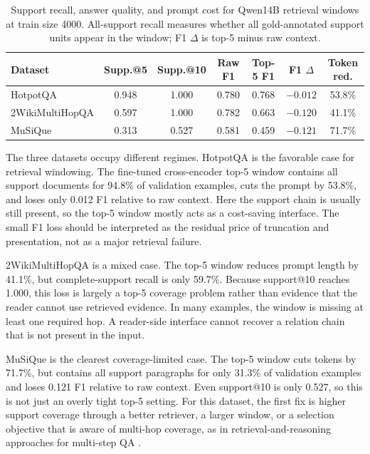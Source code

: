 \documentclass[a4paper,fleqn]{cas-sc}
\begin{document}
\begin{table}[t]
\centering
\caption{Support recall, answer quality, and prompt cost for Qwen14B retrieval
windows at train size 4000. All-support recall measures whether all
gold-annotated support units appear in the window; F1 $\Delta$ is top-5 minus
raw context.}
\label{tab:retrieval-recall-cost}
\small
\setlength{\tabcolsep}{2.8pt}
\begin{tabular}{lcccccc}
\toprule
Dataset & Supp.@5 & Supp.@10 & Raw F1 & Top-5 F1 & F1 $\Delta$ & Token red. \\
\midrule
HotpotQA & 0.948 & 1.000 & 0.780 & 0.768 & $-0.012$ & 53.8\% \\
2WikiMultiHopQA & 0.597 & 1.000 & 0.782 & 0.663 & $-0.120$ & 41.1\% \\
MuSiQue & 0.313 & 0.527 & 0.581 & 0.459 & $-0.121$ & 71.7\% \\
\bottomrule
\end{tabular}
\end{table}

The three datasets occupy different regimes. HotpotQA is the favorable case
for retrieval windowing. The fine-tuned cross-encoder top-5 window contains all
support documents for 94.8\% of validation examples, cuts the prompt by 53.8\%,
and loses only 0.012 F1 relative to raw context. Here the support chain is
usually still present, so the top-5 window mostly acts as a cost-saving
interface. The small F1 loss should be interpreted as the residual price of
truncation and presentation, not as a major retrieval failure.

2WikiMultiHopQA is a mixed case. The top-5 window reduces prompt length by
41.1\%, but complete-support recall is only 59.7\%. Because support@10 reaches
1.000, this loss is largely a top-5 coverage problem rather than evidence that
the reader cannot use retrieved evidence. In many examples, the window is
missing at least one required hop. A reader-side interface cannot recover a
relation chain that is not present in the input.

MuSiQue is the clearest coverage-limited case. The top-5 window cuts tokens by
71.7\%, but contains all support paragraphs for only 31.3\% of validation
examples and loses 0.121 F1 relative to raw context. Even support@10 is only
0.527, so this is not just an overly tight top-5 setting. For this dataset, the
first fix is higher support coverage through a better retriever, a larger
window, or a selection objective that is aware of multi-hop coverage, as in
retrieval-and-reasoning approaches for multi-step QA
\citep{asai2020reasoningpaths,trivedi2023ircot}.
\end{document}
